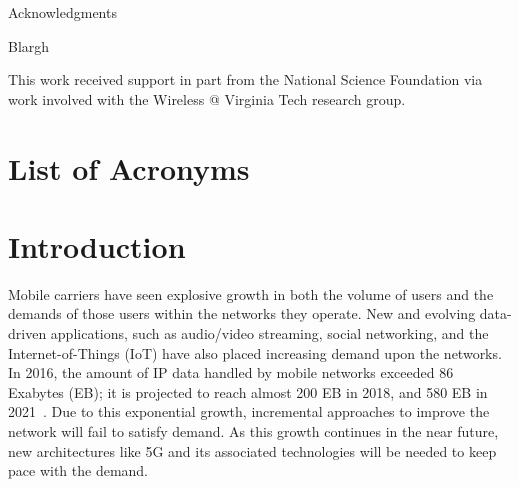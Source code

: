 \documentclass[12pt,dvipsnames]{report}
\begin{document}
\pagebreak

\begin{center}

{\large Acknowledgments}

\end{center}

%
Blargh

\vfill

This work received support in part from the National Science Foundation via work involved with the Wireless @ Virginia Tech research group.

\pagebreak

\tableofcontents
\pagebreak

\listoffigures
\pagebreak

\listoftables
\pagebreak

\chapter*{List of Acronyms}
\begin{acronym}
\end{acronym}

\pagestyle{myheadings}

\chapter{Introduction} \label{ch:intro}

Mobile carriers have seen explosive growth in both the volume of users and the demands of those users within the networks they operate.  New and evolving data-driven applications, such as audio/video streaming, social networking, and the Internet-of-Things (IoT) have also placed increasing demand upon the networks.  In 2016, the amount of IP data handled by mobile networks exceeded 86 Exabytes (EB); it is projected to reach almost 200 EB in 2018, and 580 EB in 2021~\cite{ciscoVNI2017}.  Due to this exponential growth, incremental approaches to improve the network will fail to satisfy demand.  As this growth continues in the near future, new architectures like 5G and its associated technologies will be needed to keep pace with the demand.
\end{document}

